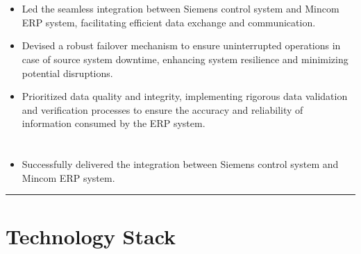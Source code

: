 \documentclass[12pt]{res}
\begin{document}
\begin{resume}
\begin{multicols}{2}
	\section{}
		\begin{itemize}
			\item Led the seamless integration between Siemens control system and Mincom ERP system, facilitating efficient data exchange and communication.

\item Devised a robust failover mechanism to ensure uninterrupted operations in case of source system downtime, enhancing system resilience and minimizing potential disruptions.

\item Prioritized data quality and integrity, implementing rigorous data validation and verification processes to ensure the accuracy and reliability of information consumed by the ERP system.
		\end{itemize}
	\section{}
		\begin{itemize}
			\setlength{\itemindent}{0pt}
			\item Successfully delivered the integration between Siemens control system and Mincom ERP system.
		\end{itemize}
\end{multicols}

\vspace{-20pt}
\begin{minipage}[t]{0.55\linewidth}
	\rule{0.25\textwidth}{2pt}
	\begin{multicols}{2}
		\section{Technology Stack}
		\columnbreak
		\section{}
	\end{multicols}
	\vspace{1pt}
\end{minipage}
\hfill
\begin{minipage}[t]{0.42\linewidth}
	\vspace{18pt}

\end{minipage}
\end{resume}
\end{document}
